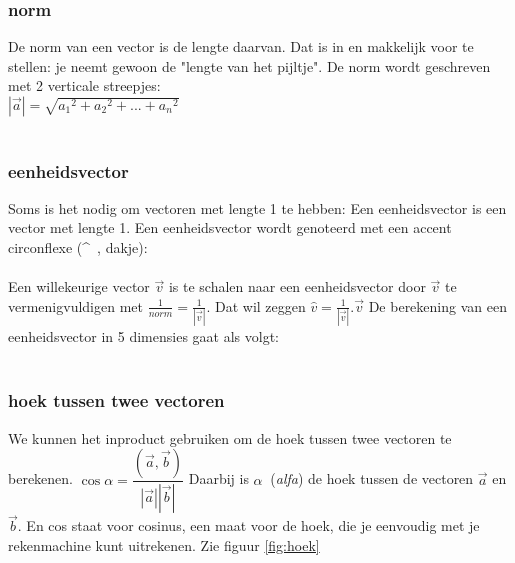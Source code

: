 \subsubsection{norm}
De norm van een vector is de lengte daarvan. Dat is in \RD en \RT makkelijk  voor te stellen: je neemt gewoon de "lengte van het pijltje". De norm wordt geschreven met 2 verticale streepjes:\\

{$|\vec{a}| = \sqrt{ {a_1}^{2} + {a_2}^{2} + . . . +{a_n}^{2}}$\\ \\}


\subsubsection{eenheidsvector}
Soms is het nodig om vectoren met lengte 1 te hebben:
{Een eenheidsvector is een vector met lengte 1.}
Een eenheidsvector wordt genoteerd met een accent circonflexe (\textasciicircum \ , dakje):\\ 

\\ 
Een willekeurige vector $ \vec{v} $  is te schalen naar een eenheidsvector door $ \vec{v} $   te vermenigvuldigen met $ \frac{1}{norm} =  \frac{1}{ |\vec{v}|} $. 
Dat wil zeggen $\hat{v} =  \frac{1}{ |\vec{v}|}.\vec{v} $
De berekening van een eenheidsvector in 5 dimensies gaat als volgt: \\ \\


\subsubsection{hoek tussen twee vectoren}
We kunnen het inproduct gebruiken om de hoek tussen twee vectoren te berekenen. 
{\quad  
	$\cos \alpha = \dfrac{(\vec{a}, \vec{b}) }{|\vec{a}| |\vec{b}|} $}
Daarbij is $\alpha \ $ (\textit{alfa}) de hoek tussen de vectoren $\vec{a}$ en $\vec{b}.$ En cos staat voor cosinus, een maat voor de hoek, die je eenvoudig met je rekenmachine kunt uitrekenen. Zie figuur \ref{fig:hoek}  \\ \\

